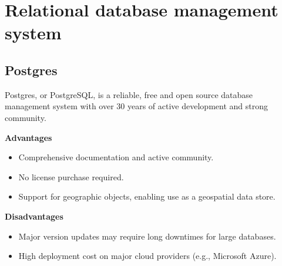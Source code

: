 \section{Relational database management system}
\subsection{Postgres}
Postgres, or PostgreSQL\cite{postgresql}, is a reliable, free and open source database management system with over 30 years of active development and strong community.

\textbf{Advantages}
\begin{itemize}
    \item Comprehensive documentation and active community.
    \item No license purchase required.
    \item Support for geographic objects, enabling use as a geospatial data store.
\end{itemize}

\textbf{Disadvantages}
\begin{itemize}
    \item Major version updates may require long downtimes for large databases.
    \item High deployment cost on major cloud providers (e.g., Microsoft Azure).
\end{itemize}